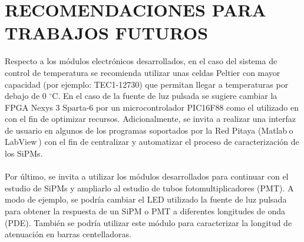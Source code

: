 \chapter{RECOMENDACIONES PARA TRABAJOS FUTUROS}
\label{Cap:Recomendaciones}
Respecto a los módulos electrónicos desarrollados, en el caso del sistema de control de temperatura se recomienda utilizar unas celdas Peltier con mayor capacidad (por ejemplo: TEC1-12730) que permitan llegar a temperaturas por debajo de 0 $^\circ$C. En el caso de la fuente de luz pulsada se sugiere cambiar la FPGA Nexys 3 Sparta-6 por un microcontrolador PIC16F88 como el utilizado en \citep{Deisgn_LED_driver} con el fin de optimizar recursos. Adicionalmente, se invita  a realizar una interfaz de usuario en algunos de los programas soportados por la Red Pitaya (Matlab\textsuperscript \textregistered $~$o LabView\textsuperscript \textregistered $~$) con el fin de centralizar y automatizar el proceso de caracterización de los SiPMs.\\ \\
Por último, se invita a utilizar los módulos desarrollados para continuar con el estudio de SiPMs y ampliarlo al estudio de tubos fotomultiplicadores (PMT). A modo de ejemplo, se podría cambiar el LED utilizado la fuente de luz pulsada para obtener la respuesta de un SiPM o PMT a diferentes longitudes de onda (PDE). También se podría utilizar este módulo para caracterizar la longitud de atenuación en barras centelladoras.

